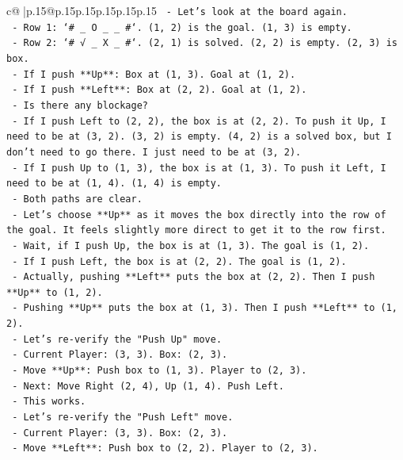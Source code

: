 \documentclass{article}
\begin{document}
{\begin{supertabular}{c@{$\;$}|p{.15\linewidth}@{}p{.15\linewidth}p{.15\linewidth}p{.15\linewidth}p{.15\linewidth}p{.15\linewidth}}
{{{\texttt{    {-} Let's look at the board again.} \\
\texttt{    {-} Row 1: `\# \_ O \_ \_ \#`. (1, 2) is the goal. (1, 3) is empty.} \\
\texttt{    {-} Row 2: `\# √ \_ X \_ \#`. (2, 1) is solved. (2, 2) is empty. (2, 3) is box.} \\
\texttt{    {-} If I push **Up**: Box at (1, 3). Goal at (1, 2).} \\
\texttt{    {-} If I push **Left**: Box at (2, 2). Goal at (1, 2).} \\
\texttt{    {-} Is there any blockage?} \\
\texttt{    {-} If I push Left to (2, 2), the box is at (2, 2). To push it Up, I need to be at (3, 2). (3, 2) is empty. (4, 2) is a solved box, but I don't need to go there. I just need to be at (3, 2).} \\
\texttt{    {-} If I push Up to (1, 3), the box is at (1, 3). To push it Left, I need to be at (1, 4). (1, 4) is empty.} \\
\texttt{    {-} Both paths are clear.} \\
\texttt{    {-} Let's choose **Up** as it moves the box directly into the row of the goal. It feels slightly more direct to get it to the row first.} \\
\texttt{    {-} Wait, if I push Up, the box is at (1, 3). The goal is (1, 2).} \\
\texttt{    {-} If I push Left, the box is at (2, 2). The goal is (1, 2).} \\
\texttt{    {-} Actually, pushing **Left** puts the box at (2, 2). Then I push **Up** to (1, 2).} \\
\texttt{    {-} Pushing **Up** puts the box at (1, 3). Then I push **Left** to (1, 2).} \\
\texttt{    {-} Let's re{-}verify the "Push Up" move.} \\
\texttt{    {-} Current Player: (3, 3). Box: (2, 3).} \\
\texttt{    {-} Move **Up**: Push box to (1, 3). Player to (2, 3).} \\
\texttt{    {-} Next: Move Right (2, 4), Up (1, 4). Push Left.} \\
\texttt{    {-} This works.} \\
\texttt{    {-} Let's re{-}verify the "Push Left" move.} \\
\texttt{    {-} Current Player: (3, 3). Box: (2, 3).} \\
\texttt{    {-} Move **Left**: Push box to (2, 2). Player to (2, 3).} \\
}}}
\end{supertabular}}
\end{document}

